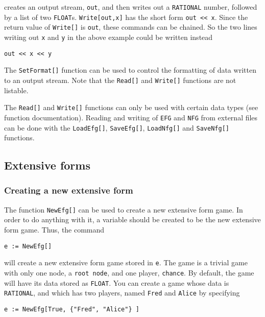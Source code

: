 \noindent
creates an output stream, \verb+out+, and then writes out a \verb+RATIONAL+
number, followed by a list of two \verb+FLOAT+s.  \verb+Write[out,x]+ has the
short form \verb+out << x+.  Since the return value of \verb+Write[]+ is
\verb+out+, these commands can be chained.  So the two lines writing out
\verb+x+ and \verb+y+ in the above example could be written instead

\begin{verbatim}
out << x << y
\end{verbatim}
 
The \verb+SetFormat[]+ function can be used to control the formatting of data
written to an output stream.  Note that the \verb+Read[]+ and \verb+Write[]+
functions are not listable.

The \verb+Read[]+ and \verb+Write[]+ functions can only be used with
certain data types (see function documentation).  Reading and writing
of \verb+EFG+ and \verb+NFG+ from external files can be done with the
\verb+LoadEfg[]+, \verb+SaveEfg[]+, \verb+LoadNfg[]+ and
\verb+SaveNfg[]+ functions.

\subsection{Extensive forms}

\subsubsection{Creating a new extensive form}

The function {\tt NewEfg[]} can be used to create a new extensive form game.
In order to do anything with it, a variable should be created to be
the new extensive form game.  Thus, the command

\begin{verbatim}
e := NewEfg[]
\end{verbatim}

\noindent will create a new extensive form game stored in \verb+e+.  The game 
is a trivial game with only one node, a \verb+root node+, and one
player, \verb+chance+.  By default, the game will have its data stored
as \verb+FLOAT+.  You can create a game whose data is \verb+RATIONAL+,
and which has two players, named \verb+Fred+ and \verb+Alice+  by
specifying 


\begin{verbatim}
e := NewEfg[True, {"Fred", "Alice"} ]
\end{verbatim}

